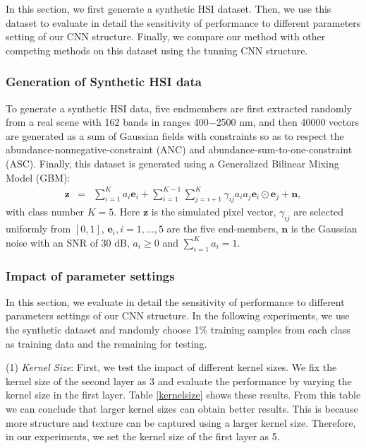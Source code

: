 \documentclass[journal]{IEEEtran}
\begin{document}
		{{In this section, we first generate a synthetic HSI dataset. Then, we use this dataset to evaluate in detail the sensitivity of performance to different parameters setting of our CNN structure. Finally, we compare our method with other competing methods on this dataset using the tunning CNN structure.}}
		
		\subsubsection{Generation of Synthetic HSI data}
		To generate a synthetic HSI data, five endmembers are first extracted  randomly from a real scene with 162 bands in ranges 400$-$2500 nm, and then 40000 vectors are generated as a sum of Gaussian fields with constraints so as to respect the abundance-nonnegative-constraint (ANC) and abundance-sum-to-one-constraint (ASC). Finally, this dataset is generated using a Generalized Bilinear Mixing Model (GBM)\cite{zhu2017unsupervised}:
		\begin{eqnarray}
		\mathbf{z}&=& \sum_{i=1}^{K}a_{i}\mathbf{e}_{i}+\sum_{i=1}^{K-1}\sum_{j=i+1}^{K}\gamma_{ij}a_{i}a_{j}\mathbf{e}_{i}\odot\mathbf{e}_{j}+\mathbf{n},
		\end{eqnarray}
		with class number $K=5$. Here $\mathbf{z}$ is the simulated pixel vector, $\gamma_{ij}$ are selected uniformly from $[0,1]$, $\mathbf{e}_{i}, i=1,\dots,5$ are the five end-members, $\mathbf{n}$ is the Gaussian noise with an SNR of 30 dB, $a_{i}\geq 0$ and $\sum_{i=1}^{K}a_{i}=1$. 
		


		\subsubsection{Impact of parameter settings}
		In this section, we evaluate in detail the sensitivity of performance to different parameters settings {{of our CNN structure}}. In the following experiments, we use {{the synthetic dataset}} and randomly choose 1\% training samples from each class as training data and the remaining for testing.
		
		(1) \textit{Kernel Size}: First, we test the impact of different kernel sizes. We fix the kernel size of the second layer as 3 and evaluate the performance by varying the kernel size in the first layer. Table \ref{kernelsize} shows these results. From this table we can conclude that larger kernel sizes can obtain better results. This is because more structure and texture can be captured using a larger kernel size. Therefore, in our experiments, we set the kernel size of the first layer as 5.  
		
\end{document}
